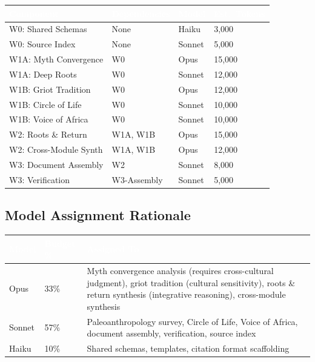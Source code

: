 \documentclass[11pt,letterpaper]{article}
\newcommand{\tableheader}[1]{\textbf{\sffamily\textcolor{white}{#1}}}
\begin{document}
\begin{center}
\begin{tabularx}{\textwidth}{L{3.5cm}L{2.5cm}C{1.5cm}C{1.8cm}}
\toprule
{}
\tableheader{Component} & \tableheader{Dependencies} & \tableheader{Model} & \tableheader{Est.\ Tokens} \\
\midrule
W0: Shared Schemas & None & Haiku & 3,000 \\
W0: Source Index & None & Sonnet & 5,000 \\
W1A: Myth Convergence & W0 & Opus & 15,000 \\
W1A: Deep Roots & W0 & Sonnet & 12,000 \\
W1B: Griot Tradition & W0 & Opus & 12,000 \\
W1B: Circle of Life & W0 & Sonnet & 10,000 \\
W1B: Voice of Africa & W0 & Sonnet & 10,000 \\
W2: Roots \& Return & W1A, W1B & Opus & 15,000 \\
W2: Cross-Module Synth & W1A, W1B & Opus & 12,000 \\
W3: Document Assembly & W2 & Sonnet & 8,000 \\
W3: Verification & W3-Assembly & Sonnet & 5,000 \\
\bottomrule
\end{tabularx}
\end{center}

\subsection{Model Assignment Rationale}

\begin{center}
\begin{tabularx}{\textwidth}{C{1.5cm}C{1.5cm}X}
\toprule
{}
\tableheader{Model} & \tableheader{Budget \%} & \tableheader{Assigned To} \\
\midrule
Opus & 33\% & Myth convergence analysis (requires cross-cultural judgment), griot tradition (cultural sensitivity), roots \& return synthesis (integrative reasoning), cross-module synthesis \\
Sonnet & 57\% & Paleoanthropology survey, Circle of Life, Voice of Africa, document assembly, verification, source index \\
Haiku & 10\% & Shared schemas, templates, citation format scaffolding \\
\bottomrule
\end{tabularx}
\end{center}
\end{document}
